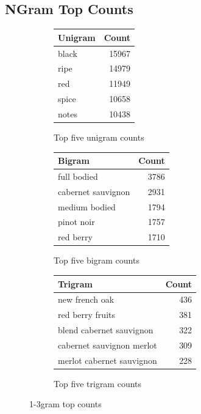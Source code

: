 \documentclass[11pt]{article}
\begin{document}
\subsection{NGram Top Counts}
\begin{figure}
    \centering
    \begin{subfigure}[t]{0.4\textwidth}
        \centering
        \begin{tabular}{ lr  }
            \hline
            Unigram & Count \\
            \hline
            black  & 15967 \\
            ripe   & 14979 \\
            red    & 11949 \\
            spice  & 10658 \\
            notes  & 10438
        \end{tabular}
        \caption{ Top five unigram counts}
    \end{subfigure}
    \begin{subfigure}[t]{0.4\textwidth}
        \centering
        \begin{tabular}{ lr  }
            \hline
            Bigram & Count \\
            \hline
            full bodied & 3786 \\
            cabernet sauvignon & 2931 \\
            medium bodied & 1794 \\
            pinot noir & 1757 \\
            red berry & 1710
        \end{tabular}
        \caption{ Top five bigram counts}
    \end{subfigure}
    \begin{subfigure}[t]{\textwidth}
        \centering
        \begin{tabular}{ lr  }
            \hline
            Trigram & Count \\
            \hline
            new french oak  & 436 \\
            red berry fruits & 381 \\
            blend cabernet sauvignon & 322 \\
            cabernet sauvignon merlot & 309 \\
            merlot cabernet sauvignon & 228 
        \end{tabular}
        \caption{ Top five trigram counts}
    \end{subfigure}
    \caption{1-3gram top counts}
    \end{figure}
\end{document}
